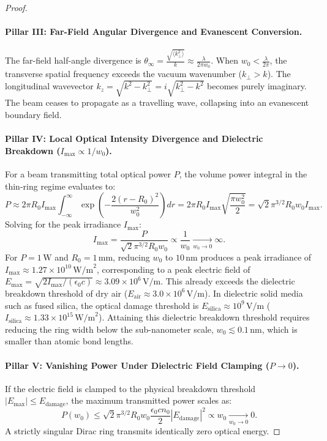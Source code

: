 \documentclass[11pt,a4paper]{article}
\begin{document}
\begin{proof}
\paragraph{Pillar III: Far-Field Angular Divergence and Evanescent Conversion.}
The far-field half-angle divergence is $\theta_\infty = \frac{\sqrt{\langle k_\perp^2 \rangle}}{k} \approx \frac{\lambda}{2\pi w_0}$. When $w_0 < \frac{\lambda}{2\pi}$, the transverse spatial frequency exceeds the vacuum wavenumber ($k_\perp > k$). The longitudinal wavevector $k_z = \sqrt{k^2 - k_\perp^2} = i \sqrt{k_\perp^2 - k^2}$ becomes purely imaginary. The beam ceases to propagate as a travelling wave, collapsing into an evanescent boundary field.

\paragraph{Pillar IV: Local Optical Intensity Divergence and Dielectric Breakdown ($I_{\max} \propto 1/w_0$).}
For a beam transmitting total optical power $P$, the volume power integral in the thin-ring regime evaluates to:
\begin{equation}
P \approx 2\pi R_0 I_{\max} \int_{-\infty}^\infty \exp\left( - \frac{2(r - R_0)^2}{w_0^2} \right) dr = 2\pi R_0 I_{\max} \sqrt{\frac{\pi w_0^2}{2}} = \sqrt{2}\pi^{3/2} R_0 w_0 I_{\max}.
\label{eq:power_volume_integral}
\end{equation}
Solving for the peak irradiance $I_{\max}$:
\begin{equation}
\boxed{I_{\max} = \frac{P}{\sqrt{2}\pi^{3/2} R_0 w_0} \propto \frac{1}{w_0} \xrightarrow[w_0 \to 0]{} \infty.}
\label{eq:pillar4_result}
\end{equation}
For $P = 1\,\text{W}$ and $R_0 = 1\,\text{mm}$, reducing $w_0$ to $10\,\text{nm}$ produces a peak irradiance of $I_{\max} \approx 1.27 \times 10^{10}\,\text{W/m}^2$, corresponding to a peak electric field of $E_{\max} = \sqrt{2 I_{\max} / (\epsilon_0 c)} \approx 3.09 \times 10^6\,\text{V/m}$. This already exceeds the dielectric breakdown threshold of dry air ($E_{\text{air}} \approx 3.0 \times 10^6\,\text{V/m}$). In dielectric solid media such as fused silica, the optical damage threshold is $E_{\text{silica}} \approx 10^9\,\text{V/m}$ ($I_{\text{silica}} \approx 1.33 \times 10^{15}\,\text{W/m}^2$). Attaining this dielectric breakdown threshold requires reducing the ring width below the sub-nanometer scale, $w_0 \lesssim 0.1\,\text{nm}$, which is smaller than atomic bond lengths.

\paragraph{Pillar V: Vanishing Power Under Dielectric Field Clamping ($P \to 0$).}
If the electric field is clamped to the physical breakdown threshold $|E_{\max}| \le E_{\text{damage}}$, the maximum transmitted power scales as:
\begin{equation}
\boxed{P(w_0) \le \sqrt{2}\pi^{3/2} R_0 w_0 \frac{\epsilon_0 c n_0}{2} |E_{\text{damage}}|^2 \propto w_0 \xrightarrow[w_0 \to 0]{} 0.}
\label{eq:pillar5_result}
\end{equation}
A strictly singular Dirac ring transmits identically zero optical energy.


\end{proof}
\end{document}

